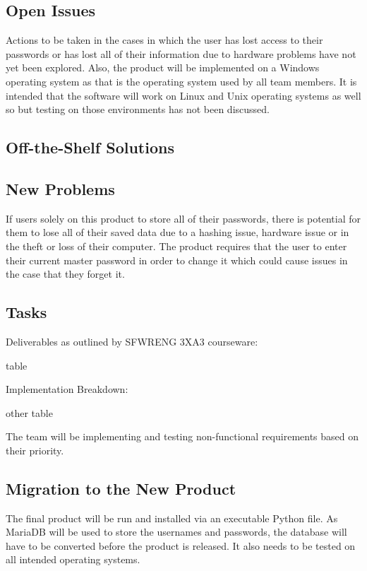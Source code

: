 \documentclass[12pt, titlepage]{article}
\begin{document}
\subsection{Open Issues}

Actions to be taken in the cases in which the user has lost access to their passwords or has lost all of their information due to hardware problems have not yet been explored. Also, the product will be implemented on a Windows operating system as that is the operating system used by all team members. It is intended that the software will work on Linux and Unix operating systems as well so but testing on those environments has not been discussed.

\subsection{Off-the-Shelf Solutions}

\subsection{New Problems}

If users solely on this product to store all of their passwords, there is potential for them to lose all of their saved data due to a hashing issue, hardware issue or in the theft or loss of their computer. The product requires that the user to enter their current master password in order to change it which could cause issues in the case that they forget it.

\subsection{Tasks}

Deliverables as outlined by SFWRENG 3XA3 courseware:

table

Implementation Breakdown:

other table

The team will be implementing and testing non-functional requirements based on their priority.

\subsection{Migration to the New Product}

The final product will be run and installed via an executable Python file. As MariaDB will be used to store the usernames and passwords, the database will have to be converted before the product is released. It also needs to be tested on all intended operating systems.
\end{document}
